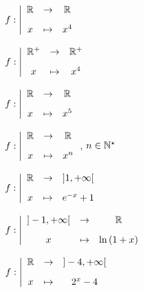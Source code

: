 \documentclass[a4paper, 11pt,reqno]{article}
\begin{document}
\begin{exercice}
\begin{enumerate}
\begin{minipage}[t]{0.3\textwidth}
			\item $f:\left|\begin{array}{ccc} \R&\rightarrow& \R\vsec\\ x & \mapsto & x^4\end{array}\right.$
			\item $f:\left|\begin{array}{ccc} \R^+&\rightarrow& \R^+\vsec\\ x & \mapsto & x^4\end{array}\right.$
			\item $f:\left|\begin{array}{ccc} \R&\rightarrow& \R\vsec\\ x & \mapsto & x^5\end{array}\right.$
			\item $f:\left|\begin{array}{ccc} \R&\rightarrow& \R\vsec\\ x & \mapsto & x^n\end{array}\right.$, $n\in\mathbb{N}^{\star}$
		\end{minipage}
		\begin{minipage}[t]{0.36\textwidth}
			\item $f:\left|\begin{array}{ccc} \R&\rightarrow& \rbrack 1,+\infty\lbrack \vsec\\ x & \mapsto & e^{-x}+1\end{array}\right.$
			\item $f:\left|\begin{array}{ccc} \rbrack -1,+\infty\lbrack&\rightarrow& \R \vsec\\ x & \mapsto & \ln{(1+x)}\end{array}\right.$
			\item $f:\left|\begin{array}{ccc} \R&\rightarrow& \rbrack -4,+\infty\lbrack \vsec\\ x & \mapsto & 2^x-4\end{array}\right.$

\end{minipage}
\end{enumerate}
\end{exercice}
\end{document}
